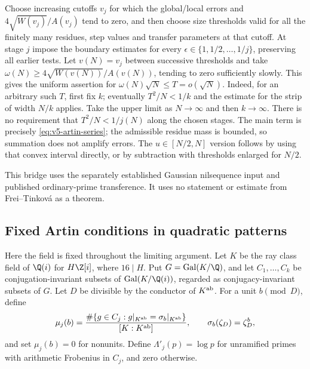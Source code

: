 Choose increasing cutoffs $v_j$ for which the global/local errors and
$4\sqrt{W(v_j)}/A(v_j)$ tend to zero, and then choose size thresholds
valid for all the finitely many residues, step values and transfer
parameters at that cutoff.
At stage $j$ impose the boundary estimates for every
$\epsilon\in\{1,1/2,\ldots,1/j\}$, preserving all earlier tests.
Let $v(N)=v_j$ between successive thresholds and take
$\omega(N)\geq4\sqrt{W(v(N))}/A(v(N))$, tending to zero sufficiently
slowly. This gives the uniform assertion for
$\omega(N)\sqrt N\leq T=o(\sqrt N)$.
Indeed, for an arbitrary such $T$, first fix $k$; eventually
$T^2/N<1/k$ and the estimate for the strip of width $N/k$ applies.
Take the upper limit as $N\to\infty$ and then $k\to\infty$.
There is no requirement that $T^2/N<1/j(N)$ along the chosen stages.
The main term is precisely \eqref{eq:v5-artin-series}; the admissible
residue mass is bounded, so summation does not amplify errors.
The $u\in[N/2,N]$ version follows by using that convex interval directly,
or by subtraction with thresholds enlarged for $N/2$.

This bridge uses the separately established Gaussian nilsequence input
and published ordinary-prime transference. It uses no statement or
estimate from Frei--Tinkov\'a as a theorem.


\subsection{Fixed Artin conditions in quadratic patterns}
\label{subsec:v5-artin-transfer}



Here the field is fixed throughout the limiting argument. Let $K$ be the
ray class field of $\Q(i)$ for $H\Z[i]$, where $16\mid H$. Put
$G=\operatorname{Gal}(K/\Q)$, and let $C_1,\ldots,C_k$ be
conjugation-invariant subsets of $\operatorname{Gal}(K/\Q(i))$,
regarded as conjugacy-invariant subsets of $G$.
Let $D$ be divisible by the conductor of $K^{\rm ab}$.
For a unit $b\pmod D$, define
\begin{equation}\label{eq:v5-mu}
 \mu_j(b)=\frac{\#\{g\in C_j:g|_{K^{\rm ab}}=\sigma_b|_{K^{\rm ab}}\}}
                  {[K:K^{\rm ab}]},
 \qquad \sigma_b(\zeta_D)=\zeta_D^b,
\end{equation}
and set $\mu_j(b)=0$ for nonunits. Define $\Lambda'_j(p)=\log p$ for
unramified primes with arithmetic Frobenius in $C_j$, and zero otherwise.

